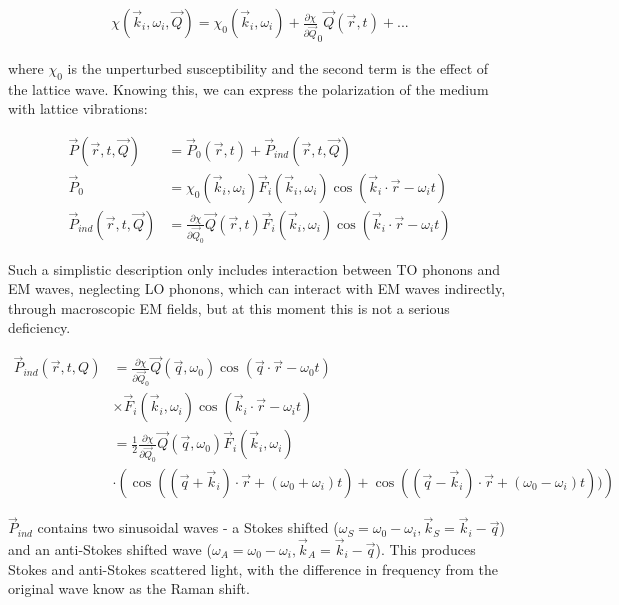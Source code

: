     \begin{align}
        \chi(\vec{k}_i, \omega_i, \vec{Q}) = \chi_0(\vec{k}_i, \omega_i) + \frac{\partial\chi}{\partial\vec{Q}}_0\vec{Q}(\vec{r},t) + ...
    \end{align}

    where $\chi_0$ is the unperturbed susceptibility and the second term is the effect of the lattice wave. Knowing this, we
    can express the polarization of the medium with lattice vibrations:

    \begin{align}
        \vec{P}(\vec{r}, t, \vec{Q}) &= \vec{P}_0(\vec{r},t) + \vec{P}_{ind}(\vec{r}, t, \vec{Q}) \\
        \vec{P}_0 &= \chi_0(\vec{k}_i, \omega_i)\vec{F}_i(\vec{k}_i, \omega_i)\cos(\vec{k}_i\cdot\vec{r} - \omega_i t) \\
        \vec{P}_{ind}(\vec{r}, t, \vec{Q}) &= \frac{\partial\chi}{\partial\vec{Q}_0}\vec{Q}(\vec{r},t)
                                                \vec{F}_i(\vec{k}_i, \omega_i)\cos(\vec{k}_i\cdot\vec{r}-\omega_i t)
    \end{align}

    Such a simplistic description only includes interaction between TO phonons and EM waves, neglecting LO phonons, which
    can interact with EM waves indirectly, through macroscopic EM fields, but at this moment this is not a serious deficiency.

    \begin{align}
        \vec{P}_{ind}(\vec{r}, t, Q) &= \frac{\partial\chi}{\partial\vec{Q}_0}\vec{Q}(\vec{q},\omega_0)\cos(\vec{q}\cdot\vec{r}-\omega_0 t) \nonumber\\
                                                &\times\vec{F}_i(\vec{k}_i, \omega_i)\cos(\vec{k}_i\cdot\vec{r}-\omega_i t) \\
                    &= \frac{1}{2}\frac{\partial\chi}{\partial\vec{Q}_0}\vec{Q}(\vec{q},\omega_0)\vec{F}_i(\vec{k}_i, \omega_i) \nonumber\\
                    &\cdot \left( \cos((\vec{q} + \vec{k}_i)\cdot\vec{r} + (\omega_0 + \omega_i) t)
                                + \cos((\vec{q} - \vec{k}_i)\cdot\vec{r} + (\omega_0 - \omega_i) t)) \right)
    \end{align}

    $\vec{P}_{ind}$ contains two sinusoidal waves - a Stokes shifted ($\omega_S = \omega_0 - \omega_i, \vec{k}_S = \vec{k}_i - \vec{q}$) and an
    anti-Stokes shifted wave ($\omega_A = \omega_0 - \omega_i, \vec{k}_A = \vec{k}_i - \vec{q}$). This produces Stokes and anti-Stokes scattered
    light, with the difference in frequency from the original wave know as the Raman shift.

